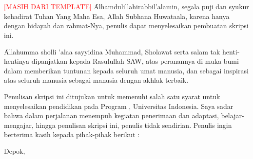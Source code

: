 \chapter*{\kataPengantar}
\textcolor{red}{[MASIH DARI TEMPLATE]} \f{Alhamdulillahirabbil'alamin}, segala puji dan syukur kehadirat Tuhan Yang Maha Esa, Allah Subhana Huwataala, karena hanya dengan hidayah dan rahmat-Nya, penulis dapat menyelesaikan pembuatan skripsi ini.

\f{Allahumma sholli 'alaa sayyidina Muhammad}, Sholawat serta salam tak henti-hentinya dipanjatkan kepada Rasulullah SAW, atas peranannya di muka bumi dalam memberikan tuntunan kepada seluruh umat manusia, dan sebagai inspirasi atas seluruh manusia sebagai manusia dengan akhlak terbaik.

Penulisan skripsi ini ditujukan untuk memenuhi salah satu syarat untuk menyelesaikan pendidikan pada Program \gelar, Universitas Indonesia. Saya sadar bahwa dalam perjalanan menempuh kegiatan penerimaan dan adaptasi, belajar-mengajar, hingga penulisan skripsi ini, penulis tidak sendirian. Penulis ingin berterima kasih kepada pihak-pihak berikut : 

\vspace*{0.1cm}
\begin{flushright}
Depok, \tanggalPengesahan \\[0.1cm]
\vspace*{1cm}
\penulis

\end{flushright}